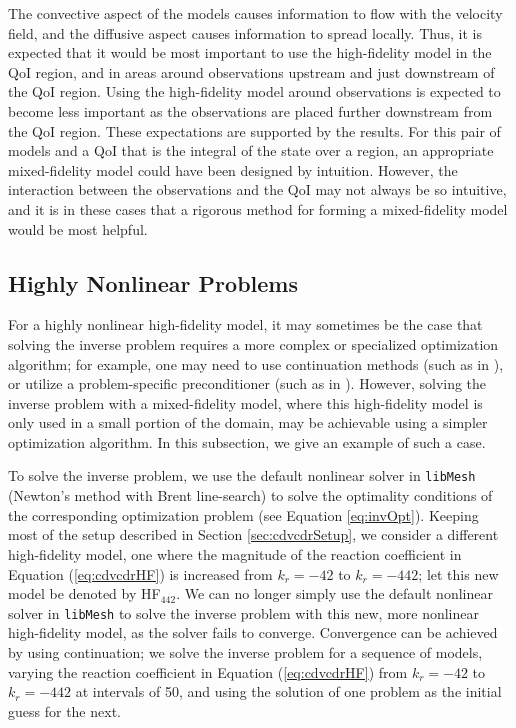 The convective aspect of the models causes information to flow with the velocity field, and the diffusive aspect causes information to spread locally. Thus, it is expected that it would be most important to use the high-fidelity model in the QoI region, and in areas around observations upstream and just downstream of the QoI region. Using the high-fidelity model around observations is expected to become less important as the observations are placed further downstream from the QoI region. These expectations are supported by the results. For this pair of models and a QoI that is the integral of the state over a region, an appropriate mixed-fidelity model could have been designed by intuition. However, the interaction between the observations and the QoI may not always be so intuitive, and it is in these cases that a rigorous method for forming a mixed-fidelity model would be most helpful.


\subsection{Highly Nonlinear Problems} \label{sec:solveRob}

For a highly nonlinear high-fidelity model, it may sometimes be the case that solving the inverse problem requires a more complex or specialized optimization algorithm; for example, one may need to use continuation methods (such as in \cite{BaoLiu03}), or utilize a problem-specific preconditioner (such as in \cite{Hanke00}). However, solving the inverse problem with a mixed-fidelity model, where this high-fidelity model is only used in a small portion of the domain, may be achievable using a simpler optimization algorithm. In this subsection, we give an example of such a case.

To solve the inverse problem, we use the default nonlinear solver in \texttt{libMesh} (Newton's method with Brent line-search) to solve the optimality conditions of the corresponding optimization problem (see Equation \ref{eq:invOpt}). Keeping most of the setup described in Section \ref{sec:cdvcdrSetup}, we consider a different high-fidelity model, one where the magnitude of the reaction coefficient in Equation (\ref{eq:cdvcdrHF}) is increased from $k_r=-42$ to $k_r=-442$; let this new model be denoted by HF$_{442}$. We can no longer simply use the default nonlinear solver in \texttt{libMesh} to solve the inverse problem with this new, more nonlinear high-fidelity model, as the solver fails to converge. Convergence can be achieved by using continuation; we solve the inverse problem for a sequence of models, varying the reaction coefficient in Equation (\ref{eq:cdvcdrHF}) from $k_r=-42$ to $k_r=-442$ at intervals of 50, and using the solution of one problem as the initial guess for the next.

